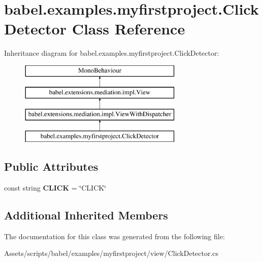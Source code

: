 \hypertarget{classbabel_1_1examples_1_1myfirstproject_1_1_click_detector}{\section{babel.\-examples.\-myfirstproject.\-Click\-Detector Class Reference}
\label{classbabel_1_1examples_1_1myfirstproject_1_1_click_detector}
}
Inheritance diagram for babel.\-examples.\-myfirstproject.\-Click\-Detector\-:\begin{figure}[H]
\begin{center}
\leavevmode
\includegraphics[height=4.000000cm]{classbabel_1_1examples_1_1myfirstproject_1_1_click_detector}
\end{center}
\end{figure}
\subsection*{Public Attributes}
\begin{DoxyCompactItemize}
\item 
\hypertarget{classbabel_1_1examples_1_1myfirstproject_1_1_click_detector_a8005d0675a4d6caf5a30205e6414f3a1}{const string {\bfseries C\-L\-I\-C\-K} = \char`\"{}C\-L\-I\-C\-K\char`\"{}}\label{classbabel_1_1examples_1_1myfirstproject_1_1_click_detector_a8005d0675a4d6caf5a30205e6414f3a1}

\end{DoxyCompactItemize}
\subsection*{Additional Inherited Members}


The documentation for this class was generated from the following file\-:\begin{DoxyCompactItemize}
\item 
Assets/scripts/babel/examples/myfirstproject/view/Click\-Detector.\-cs\end{DoxyCompactItemize}
